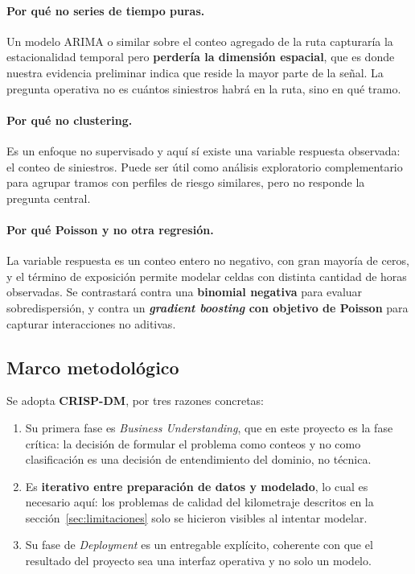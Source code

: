 \documentclass[11pt,a4paper]{article}
\begin{document}
\paragraph{Por qué no series de tiempo puras.} Un modelo ARIMA o similar sobre
el conteo agregado de la ruta capturaría la estacionalidad temporal pero
\textbf{perdería la dimensión espacial}, que es donde nuestra evidencia
preliminar indica que reside la mayor parte de la señal. La pregunta operativa
no es cuántos siniestros habrá en la ruta, sino en qué tramo.

\paragraph{Por qué no clustering.} Es un enfoque no supervisado y aquí sí existe
una variable respuesta observada: el conteo de siniestros. Puede ser útil como
análisis exploratorio complementario para agrupar tramos con perfiles de riesgo
similares, pero no responde la pregunta central.

\paragraph{Por qué Poisson y no otra regresión.} La variable respuesta es un
conteo entero no negativo, con gran mayoría de ceros, y el término de exposición
permite modelar celdas con distinta cantidad de horas observadas. Se contrastará
contra una \textbf{binomial negativa} para evaluar sobredispersión, y contra un
\textbf{\emph{gradient boosting} con objetivo de Poisson} para capturar
interacciones no aditivas.

\subsection{Marco metodológico}

Se adopta \textbf{CRISP-DM}, por tres razones concretas:

\begin{enumerate}
  \item Su primera fase es \emph{Business Understanding}, que en este proyecto
  es la fase crítica: la decisión de formular el problema como conteos y no como
  clasificación es una decisión de entendimiento del dominio, no técnica.

  \item Es \textbf{iterativo entre preparación de datos y modelado}, lo cual es
  necesario aquí: los problemas de calidad del kilometraje descritos en la
  sección~\ref{sec:limitaciones} solo se hicieron visibles al intentar modelar.

  \item Su fase de \emph{Deployment} es un entregable explícito, coherente con
  que el resultado del proyecto sea una interfaz operativa y no solo un modelo.
\end{enumerate}
\end{document}
